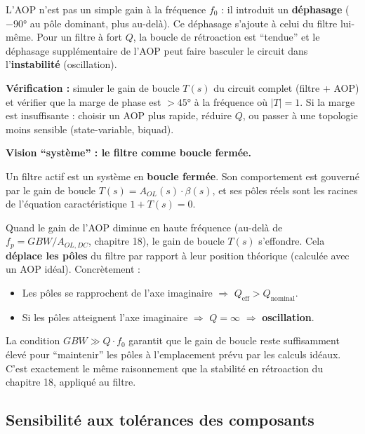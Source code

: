 \documentclass[12pt,a4paper,twoside]{book}
\begin{document}
L'AOP n'est pas un simple gain à la fréquence $f_0$ : il introduit un \textbf{déphasage} ($-90°$ au pôle dominant, plus au-delà). Ce déphasage s'ajoute à celui du filtre lui-même. Pour un filtre à fort $Q$, la boucle de rétroaction est ``tendue'' et le déphasage supplémentaire de l'AOP peut faire basculer le circuit dans l'\textbf{instabilité} (oscillation).

\begin{formule}
\textbf{Vérification :} simuler le gain de boucle $T(s)$ du circuit complet (filtre + AOP) et vérifier que la marge de phase est $> 45°$ à la fréquence où $|T| = 1$. Si la marge est insuffisante : choisir un AOP plus rapide, réduire $Q$, ou passer à une topologie moins sensible (state-variable, biquad).
\end{formule}

\begin{intuition}
\textbf{Vision ``système'' : le filtre comme boucle fermée.}

Un filtre actif est un système en \textbf{boucle fermée}. Son comportement est gouverné par le gain de boucle $T(s) = A_{OL}(s)\cdot\beta(s)$, et ses pôles réels sont les racines de l'équation caractéristique $1 + T(s) = 0$.

Quand le gain de l'AOP diminue en haute fréquence (au-delà de $f_p = GBW/A_{OL,DC}$, chapitre 18), le gain de boucle $T(s)$ s'effondre. Cela \textbf{déplace les pôles} du filtre par rapport à leur position théorique (calculée avec un AOP idéal). Concrètement :
\begin{itemize}[nosep]
\item Les pôles se rapprochent de l'axe imaginaire $\Rightarrow$ $Q_{\text{eff}} > Q_{\text{nominal}}$.
\item Si les pôles atteignent l'axe imaginaire $\Rightarrow$ $Q = \infty$ $\Rightarrow$ \textbf{oscillation}.
\end{itemize}

La condition $GBW \gg Q \cdot f_0$ garantit que le gain de boucle reste suffisamment élevé pour ``maintenir'' les pôles à l'emplacement prévu par les calculs idéaux. C'est exactement le même raisonnement que la stabilité en rétroaction du chapitre 18, appliqué au filtre.
\end{intuition}

\subsection{Sensibilité aux tolérances des composants}
\end{document}
